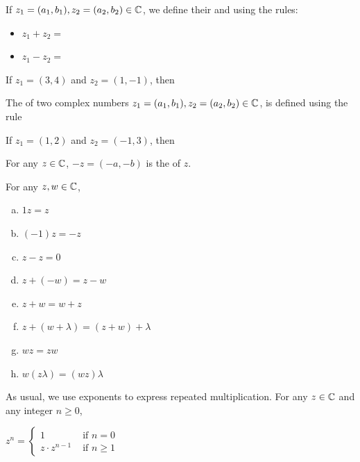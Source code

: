 \documentclass[11pt,fleqn,dvipsnames,usenames]{article}
\begin{document}
\begin{definition}
If $z_{1} = (a_{1},b_{1}), z_{2} = (a_{2},b_{2})\in\mathbb{C}$, we define their  and  using the rules:
\begin{itemize}
\item $z_{1} + z_{2} =$
\vsmsp

\item $z_{1} - z_{2} =$
\end{itemize}
\end{definition}

\begin{example}
If $z_{1} = (3,4)$ and $z_{2} = (1,-1)$, then
\end{example}
\vspace{3cm}

\begin{definition}\label{complexmultiplication}
The  of two complex numbers $z_{1} = (a_{1},b_{1}), z_{2} = (a_{2},b_{2})\in\mathbb{C}$, is defined using the rule
\vspace{2cm}
\end{definition}

\begin{example}\label{examplecomplexmultiplication}
If $z_{1} = (1,2)$ and $z_{2} = (-1,3)$, then
\end{example}
\vspace{3cm}

\notation For any $z\in\mathbb{C}$, $-z = (-a,-b)$ is the  of $z$.
\vsp

\properties For any $z,w\in\mathbb{C}$,
\begin{multicols}{2}
\begin{enumerate}[(a)]
\item $1z = z$
\item $(-1)z = -z$
\item $z - z = 0$
\item $z + (-w) = z - w$
\item $z + w = w + z$
\item $z + (w + \lambda) = (z + w) + \lambda$
\item $wz = zw$
\item $w(z\lambda) = (wz)\lambda$
\end{enumerate}
\end{multicols}
\newpage

\notation As usual, we use exponents to express repeated multiplication.  For any $z\in\mathbb{C}$ and any integer $n\geq 0$,
\begin{center}
$z^{n} = \begin{cases} 1 & \text{ if }n = 0\\z\cdot z^{n-1} &\text{ if }n \geq 1\end{cases}$
\end{center}
\end{document}
